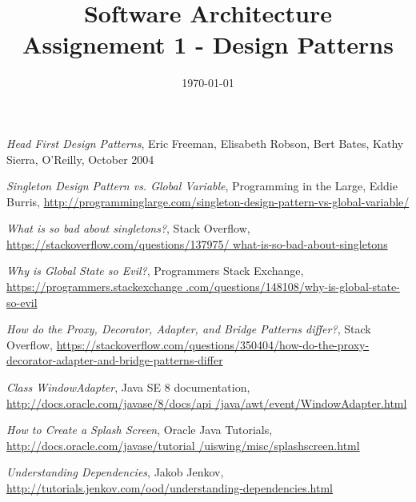 \documentclass[a4paper, 11pt]{article}
\title{
	\textbf{Software Architecture}\\
    \Large{Assignement 1 - Design Patterns}
}
\date{\today}
\begin{document}
\maketitle
\newpage

\tableofcontents
\newpage





\begin{thebibliography}{10}

 \emph{Head First Design Patterns}, Eric Freeman, Elisabeth Robson, Bert Bates, Kathy Sierra, O'Reilly, October 2004

 \emph{Singleton Design Pattern vs. Global Variable}, Programming in the Large, Eddie Burris, \href{http://programminglarge.com/singleton-design-pattern-vs-global-variable/}{http://programminglarge.com/singleton-design-pattern-vs-global-variable/}

 \emph{What is so bad about singletons?}, Stack Overflow, \href{https://stackoverflow.com/questions/137975/what-is-so-bad-about-singletons}{https://stackoverflow.com/questions/137975/ what-is-so-bad-about-singletons}

 \emph{Why is Global State so Evil?}, Programmers Stack Exchange, \href{https://programmers.stackexchange.com/questions/148108/why-is-global-state-so-evil}{https://programmers.stackexchange .com/questions/148108/why-is-global-state-so-evil}

 \emph{How do the Proxy, Decorator, Adapter, and Bridge Patterns differ?}, Stack Overflow, \href{https://stackoverflow.com/questions/350404/how-do-the-proxy-decorator-adapter-and-bridge-patterns-differ}{https://stackoverflow.com/questions/350404/how-do-the-proxy-decorator-adapter-and-bridge-patterns-differ}

 \emph{Class WindowAdapter}, Java SE 8 documentation, \href{http://docs.oracle.com/javase/8/docs/api/java/awt/event/WindowAdapter.html}{http://docs.oracle.com/javase/8/docs/api /java/awt/event/WindowAdapter.html}

 \emph{How to Create a Splash Screen}, Oracle Java Tutorials, \href{http://docs.oracle.com/javase/tutorial/uiswing/misc/splashscreen.html}{http://docs.oracle.com/javase/tutorial /uiswing/misc/splashscreen.html}

 \emph{Understanding Dependencies}, Jakob Jenkov, \href{http://tutorials.jenkov.com/ood/understanding-dependencies.html}{http://tutorials.jenkov.com/ood/understanding-dependencies.html}
\end{thebibliography}
\end{document}
